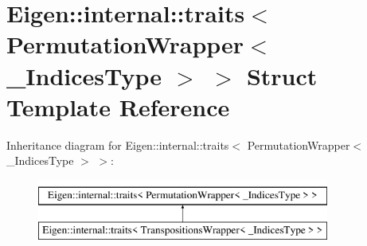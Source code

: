 \hypertarget{struct_eigen_1_1internal_1_1traits_3_01_permutation_wrapper_3_01___indices_type_01_4_01_4}{}\section{Eigen\+::internal\+::traits$<$ Permutation\+Wrapper$<$ \+\_\+\+Indices\+Type $>$ $>$ Struct Template Reference}
\label{struct_eigen_1_1internal_1_1traits_3_01_permutation_wrapper_3_01___indices_type_01_4_01_4}
Inheritance diagram for Eigen\+::internal\+::traits$<$ Permutation\+Wrapper$<$ \+\_\+\+Indices\+Type $>$ $>$\+:\begin{figure}[H]
\begin{center}
\leavevmode
\includegraphics[height=2.000000cm]{struct_eigen_1_1internal_1_1traits_3_01_permutation_wrapper_3_01___indices_type_01_4_01_4}
\end{center}
\end{figure}
